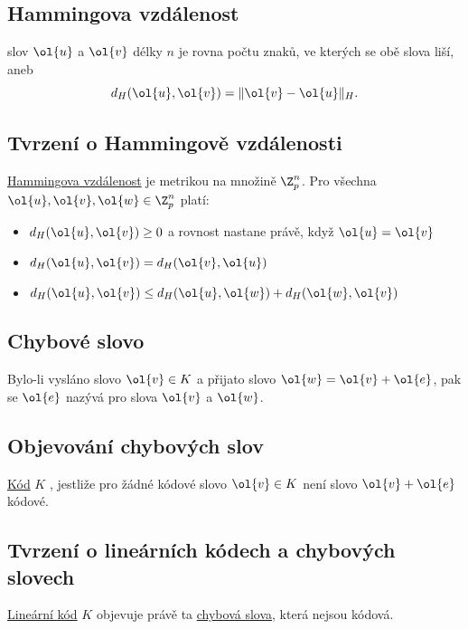 \subsection{Hammingova vzdálenost}\label{hamVz}
 slov $\ol{u}$ a $\ol{v}$ délky $n$ je rovna počtu znaků, ve kterých se obě slova liší, aneb
\begin{equation}
	d_H(\ol{u}, \ol{v}) = \|\ol{v} - \ol{u}\|_H.
\end{equation}

\subsection{Tvrzení o Hammingově vzdálenosti}
\hyperref[hamVz]{Hammingova vzdálenost} je metrikou na množině $\Z_p^n$. Pro všechna $\ol{u}, \ol{v}, \ol{w} \in \Z_p^n$ platí:
\vspace{-1em}
\begin{itemize}
	\item $d_H(\ol{u}, \ol{v}) \geq 0$ a rovnost nastane právě, když $\ol{u} = \ol{v}$
	\item $d_H(\ol{u}, \ol{v}) = d_H(\ol{v}, \ol{u})$
	\item $d_H(\ol{u}, \ol{v}) \leq d_H(\ol{u}, \ol{w}) + d_H(\ol{w}, \ol{v})$
\end{itemize}

\subsection{Chybové slovo}\label{chybSlovo}
Bylo-li vysláno slovo $\ol{v} \in K$ a přijato slovo $\ol{w} = \ol{v} + \ol{e}$, pak se $\ol{e}$ nazývá  pro slova $\ol{v}$ a $\ol{w}$.

\subsection{Objevování chybových slov}\label{objevuje}
\hyperref[kod]{Kód} $K$ , jestliže pro žádné kódové slovo $\ol{v} \in K$ není slovo $\ol{v} + \ol{e}$ kódové.

\subsection{Tvrzení o lineárních kódech a chybových slovech}
\hyperref[linKod]{Lineární kód} $K$ objevuje právě ta \hyperref[chybSlovo]{chybová slova}, která nejsou kódová.

